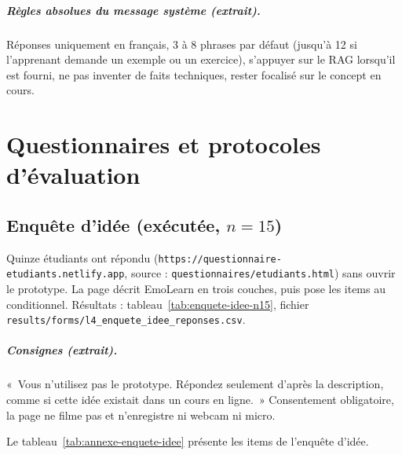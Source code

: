 \paragraph{Règles absolues du message système (extrait).}
Réponses uniquement en français, 3 à 8 phrases par défaut (jusqu'à 12 si
l'apprenant demande un exemple ou un exercice), s'appuyer sur le RAG
lorsqu'il est fourni, ne pas inventer de faits techniques, rester
focalisé sur le concept en cours.

\chapter{Questionnaires et protocoles d'évaluation}
\label{annexe:protocoles}







\section{Enquête d'idée (exécutée, $n=15$)}
\label{sec:annexe-enquete-idee}

Quinze étudiants ont répondu
(\texttt{https://questionnaire-etudiants.netlify.app}, 
source : \texttt{questionnaires/etudiants.html})
sans ouvrir le prototype. La page décrit EmoLearn en trois
couches, puis pose les items au conditionnel. Résultats :
tableau~\ref{tab:enquete-idee-n15}, 
fichier \texttt{results/forms/l4\_enquete\_idee\_reponses.csv}.

\paragraph{Consignes (extrait).}
«~Vous n'utilisez pas le prototype. Répondez seulement d'après la
description, comme si cette idée existait dans un cours en ligne.~»
Consentement obligatoire, la page ne filme pas et n'enregistre ni
webcam ni micro.

Le tableau~\ref{tab:annexe-enquete-idee} présente les items de l'enquête d'idée.

